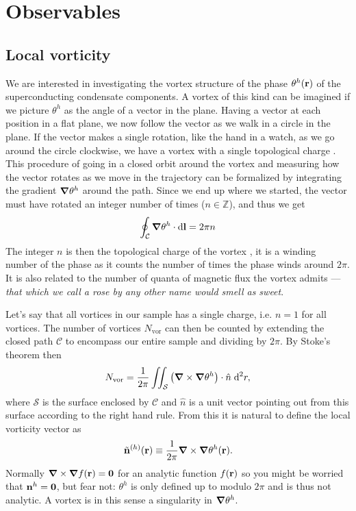 \section{Observables}

\subsection{Local vorticity}

We are interested in investigating the vortex structure of the phase $\theta^h({\boldsymbol{\mathbf{r}}})$ of the
superconducting condensate components. A vortex of this kind can be imagined if we picture
$\theta^h$ as the angle of a vector in the plane.
Having a vector at each position in a flat plane, we now
follow the vector as we walk in a circle in the plane. If the vector makes a single rotation,
like the hand in a watch, as we go around the circle clockwise,
we have a vortex with a single topological charge \cite{Smorgrav052}.
This procedure of going in a closed orbit around the vortex  and measuring how the vector rotates as we move in the
trajectory can be formalized by integrating the gradient ${\boldsymbol{\mathbf{\nabla}}}\theta^h$ around the path.
Since we end up where we started, the vector must have rotated an integer number of times 
($n\in\mathbb{Z}$), and thus we get
\begin{equation}
  \oint_\mathcal{C}{\boldsymbol{\mathbf{\nabla}}}\theta^h\cdot\mathrm{d}{\boldsymbol{\mathbf{l}}} = 2\pi n
  \label{eq:obs:plan:closedPhaseIntegral}
\end{equation}
The integer $n$ is then the topological charge of the vortex \cite{AltlandSimons10},
it is a winding number
of the phase as it counts the number of times the phase winds around $2\pi$. It is also related to
the number of quanta of magnetic flux the vortex admits --- 
\textit{that which we call a rose by any other name would smell as sweet}.

Let's say that all vortices in our sample has a single charge, i.e. $n=1$ for all vortices. The
number of vortices $N_\text{vor}$ can then be counted by extending the closed path $\mathcal{C}$
to encompass our entire sample and dividing by $2\pi$. By Stoke's theorem then
\begin{equation}
  N_\text{vor} = \frac{1}{2\pi}\iint_\mathcal{S}
  \big({\boldsymbol{\mathbf{\nabla}}}\times{\ensuremath{\boldsymbol{\mathbf{\nabla}}}}\theta^h\big)\cdot\hat{n}\;\mathrm{d}^2r,
  \label{eq:obs:plan:numberOfVortices}
\end{equation}
where $\mathcal{S}$ is the surface enclosed by $\mathcal{C}$ and $\hat{n}$ is a unit vector pointing
out from this surface according to the right hand rule. From this it is natural to define the
local vorticity vector as
\begin{equation}
  \tilde{{\boldsymbol{\mathbf{n}}}}^{(h)}({\boldsymbol{\mathbf{r}}}) \equiv \frac{1}{2\pi}{\boldsymbol{\mathbf{\nabla}}}\times{\ensuremath{\boldsymbol{\mathbf{\nabla}}}}\theta^h({\boldsymbol{\mathbf{r}}}).
  \label{eq:obs:plan:vortexDensityDef}
\end{equation}
Normally ${\boldsymbol{\mathbf{\nabla}}}\times{\ensuremath{\boldsymbol{\mathbf{\nabla}}}}f({\boldsymbol{\mathbf{r}}}) = {\boldsymbol{\mathbf{0}}}$ for an analytic function $f({\boldsymbol{\mathbf{r}}})$ so you
might be worried that ${\boldsymbol{\mathbf{n}}}^h = {\boldsymbol{\mathbf{0}}}$, but fear not: $\theta^h$ is only defined up to 
modulo $2\pi$ and is thus not analytic. A vortex is in this sense a singularity in 
${\boldsymbol{\mathbf{\nabla}}}\theta^h$.

